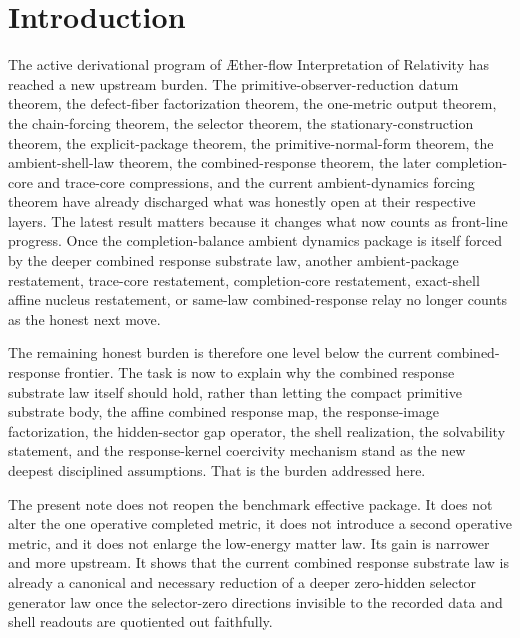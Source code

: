\documentclass[11pt]{article}
\newcommand{\Aflow}{\AE{}ther-flow}
\newcommand{\TheoryName}{\Aflow{} Interpretation of Relativity}
\newcommand{\CompletedMetric}{g^{\sharp}}
\begin{document}
\begin{abstract}
The benchmark boundary remains fixed throughout. The one operative metric is still exactly \(\CompletedMetric\), the ordinary matter route is unchanged, there is no second operative metric, the low-energy matter law is not enlarged, and stronger first-principles promotion language is still not licensed. The gain is therefore disciplined and benchmark-facing: the current combined response stopping point is no longer left as an independently inserted package, but is forced by a deeper explicit selector law after quotienting out exactly the selector-zero directions already invisible to the recorded data and shell readouts.
\end{abstract}

\section{Introduction}

The active derivational program of \TheoryName{} has reached a new upstream burden. The primitive-observer-reduction datum theorem, the defect-fiber factorization theorem, the one-metric output theorem, the chain-forcing theorem, the selector theorem, the stationary-construction theorem, the explicit-package theorem, the primitive-normal-form theorem, the ambient-shell-law theorem, the combined-response theorem, the later completion-core and trace-core compressions, and the current ambient-dynamics forcing theorem have already discharged what was honestly open at their respective layers. The latest result matters because it changes what now counts as front-line progress. Once the completion-balance ambient dynamics package is itself forced by the deeper combined response substrate law, another ambient-package restatement, trace-core restatement, completion-core restatement, exact-shell affine nucleus restatement, or same-law combined-response relay no longer counts as the honest next move.

The remaining honest burden is therefore one level below the current combined-response frontier. The task is now to explain why the combined response substrate law itself should hold, rather than letting the compact primitive substrate body, the affine combined response map, the response-image factorization, the hidden-sector gap operator, the shell realization, the solvability statement, and the response-kernel coercivity mechanism stand as the new deepest disciplined assumptions. That is the burden addressed here.

The present note does not reopen the benchmark effective package. It does not alter the one operative completed metric, it does not introduce a second operative metric, and it does not enlarge the low-energy matter law. Its gain is narrower and more upstream. It shows that the current combined response substrate law is already a canonical and necessary reduction of a deeper zero-hidden selector generator law once the selector-zero directions invisible to the recorded data and shell readouts are quotiented out faithfully.
\end{document}
